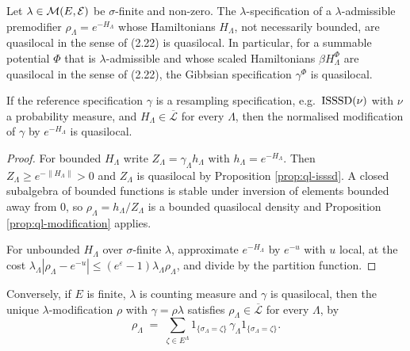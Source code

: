 \begin{theorem}[Georgii (2.24)(b)]
    \label{thm:ql-gibbsian-quasilocal}
    \leanok

    Let $\lambda \in \mathcal{M}(E, \mathcal{E})$ be $\sigma$-finite and non-zero. The
    $\lambda$-specification of a $\lambda$-admissible premodifier $\rho_\Lambda = e^{-H_\Lambda}$
    whose Hamiltonians $H_\Lambda$, not necessarily bounded, are quasilocal in the sense of
    (2.22) is quasilocal. In particular, for a summable potential $\Phi$ that is
    $\lambda$-admissible and whose scaled Hamiltonians $\beta H_\Lambda^\Phi$ are quasilocal in
    the sense of (2.22), the Gibbsian specification $\gamma^\Phi$ is quasilocal.

    If the reference specification $\gamma$ is a resampling specification, e.g.\ $\operatorname{ISSSD}(\nu)$
    with $\nu$ a probability measure, and $H_\Lambda \in \overline{\mathcal{L}}$ for every
    $\Lambda$, then the normalised modification of $\gamma$ by $e^{-H_\Lambda}$ is quasilocal.
\end{theorem}
\begin{proof}
    \leanok

    For bounded $H_\Lambda$ write $Z_\Lambda = \gamma_\Lambda h_\Lambda$ with
    $h_\Lambda = e^{-H_\Lambda}$. Then $Z_\Lambda \ge e^{-\|H_\Lambda\|} > 0$ and $Z_\Lambda$ is
    quasilocal by Proposition \ref{prop:ql-isssd}. A closed subalgebra of bounded functions is
    stable under inversion of elements bounded away from $0$, so
    $\rho_\Lambda = h_\Lambda / Z_\Lambda$ is a bounded quasilocal density and
    Proposition \ref{prop:ql-modification} applies.

    For unbounded $H_\Lambda$ over $\sigma$-finite $\lambda$, approximate $e^{-H_\Lambda}$ by
    $e^{-u}$ with $u$ local, at the cost
    $\lambda_\Lambda|\rho_\Lambda - e^{-u}| \le (e^\varepsilon - 1)\lambda_\Lambda\rho_\Lambda$,
    and divide by the partition function.
\end{proof}

\begin{remark}[Georgii (2.24)(c)]
    \label{rmk:ql-2-24-c}
    Conversely, if $E$ is finite, $\lambda$ is counting measure and $\gamma$ is quasilocal, then the
    unique $\lambda$-modification $\rho$ with $\gamma = \rho\lambda$ satisfies
    $\rho_\Lambda \in \overline{\mathcal{L}}$ for every $\Lambda$, by
    \[\rho_\Lambda \;=\; \sum_{\zeta \in E^\Lambda} 1_{\{\sigma_\Lambda = \zeta\}}\,
    \gamma_\Lambda 1_{\{\sigma_\Lambda = \zeta\}}.\]
\end{remark}

